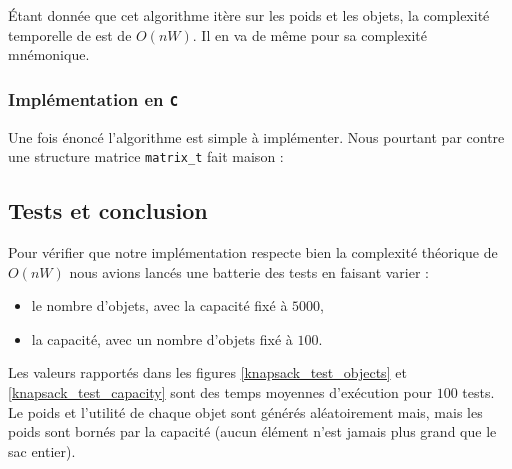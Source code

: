 Étant donnée que cet algorithme itère sur les poids et les objets, la complexité temporelle de est de $O(nW)$. Il en va de même pour sa complexité mnémonique.

\subsubsection{Implémentation en \texttt{C}}
Une fois énoncé l'algorithme est simple à implémenter. Nous pourtant par contre une structure matrice \texttt{matrix\_t} fait maison : 

 


\subsection{Tests et conclusion}

Pour vérifier que notre implémentation respecte bien la complexité théorique de $O(nW)$ nous avions lancés une batterie des tests en faisant varier : 

\begin{itemize}
\item le nombre d'objets, avec la capacité fixé à $5000$,
\item la capacité, avec un nombre d'objets fixé à $100$.
\end{itemize}

Les valeurs rapportés dans les figures \ref{knapsack_test_objects} et \ref{knapsack_test_capacity} sont des temps moyennes d'exécution pour $100$ tests. Le poids et l'utilité de chaque objet sont générés aléatoirement mais, mais les poids sont bornés par la capacité (aucun élément n'est jamais plus grand que le sac entier).

